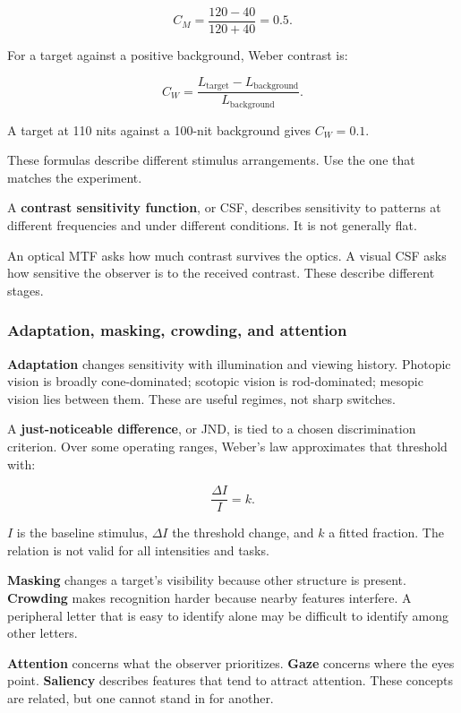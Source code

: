 \[
C_M=\frac{120-40}{120+40}=0.5.
\]

For a target against a positive background, Weber contrast is:

\[
C_W=\frac{L_{\mathrm{target}}-L_{\mathrm{background}}}
{L_{\mathrm{background}}}.
\]

A target at 110 nits against a 100-nit background gives \(C_W=0.1\).

These formulas describe different stimulus arrangements. Use the one that matches the experiment.

A \textbf{contrast sensitivity function}, or CSF, describes sensitivity to patterns at different frequencies and under different conditions. It is not generally flat.

An optical MTF asks how much contrast survives the optics. A visual CSF asks how sensitive the observer is to the received contrast. These describe different stages.

\subsubsection{Adaptation, masking, crowding, and attention}\label{04-visual-computing-ii-ch043-adaptation-masking-crowding-and-attention}

\textbf{Adaptation} changes sensitivity with illumination and viewing history. Photopic vision is broadly cone-dominated; scotopic vision is rod-dominated; mesopic vision lies between them. These are useful regimes, not sharp switches.

A \textbf{just-noticeable difference}, or JND, is tied to a chosen discrimination criterion. Over some operating ranges, Weber's law approximates that threshold with:

\[
\frac{\Delta I}{I}=k.
\]

\(I\) is the baseline stimulus, \(\Delta I\) the threshold change, and \(k\) a fitted fraction. The relation is not valid for all intensities and tasks.

\textbf{Masking} changes a target's visibility because other structure is present. \textbf{Crowding} makes recognition harder because nearby features interfere. A peripheral letter that is easy to identify alone may be difficult to identify among other letters.

\textbf{Attention} concerns what the observer prioritizes. \textbf{Gaze} concerns where the eyes point. \textbf{Saliency} describes features that tend to attract attention. These concepts are related, but one cannot stand in for another.

